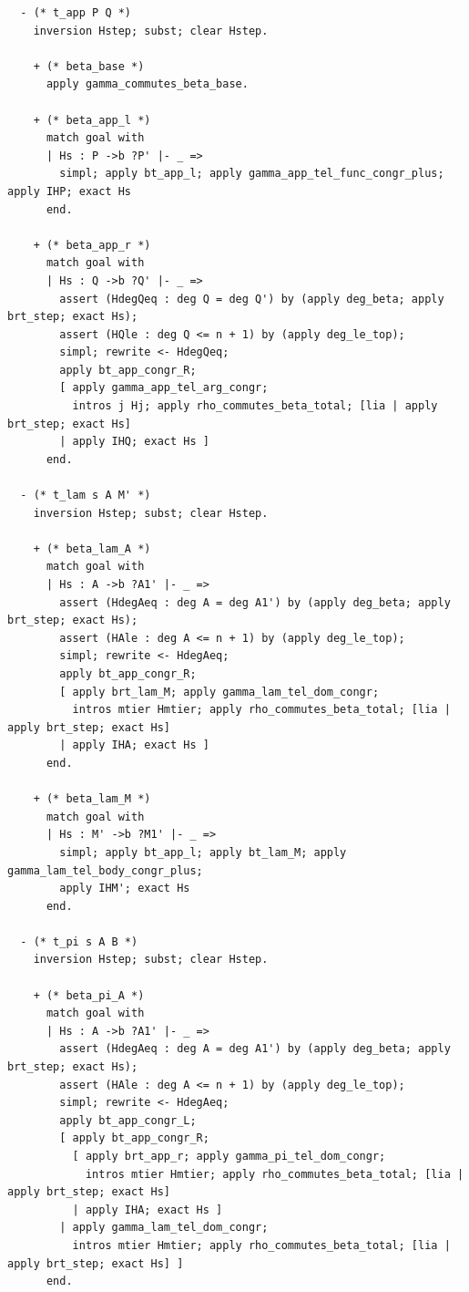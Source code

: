 \begin{latin}
\begin{verbatim}
  - (* t_app P Q *)
    inversion Hstep; subst; clear Hstep.

    + (* beta_base *)
      apply gamma_commutes_beta_base.

    + (* beta_app_l *)
      match goal with
      | Hs : P ->b ?P' |- _ =>
        simpl; apply bt_app_l; apply gamma_app_tel_func_congr_plus; apply IHP; exact Hs
      end.

    + (* beta_app_r *)
      match goal with
      | Hs : Q ->b ?Q' |- _ =>
        assert (HdegQeq : deg Q = deg Q') by (apply deg_beta; apply brt_step; exact Hs);
        assert (HQle : deg Q <= n + 1) by (apply deg_le_top);
        simpl; rewrite <- HdegQeq;
        apply bt_app_congr_R;
        [ apply gamma_app_tel_arg_congr;
          intros j Hj; apply rho_commutes_beta_total; [lia | apply brt_step; exact Hs]
        | apply IHQ; exact Hs ]
      end.

  - (* t_lam s A M' *)
    inversion Hstep; subst; clear Hstep.

    + (* beta_lam_A *)
      match goal with
      | Hs : A ->b ?A1' |- _ =>
        assert (HdegAeq : deg A = deg A1') by (apply deg_beta; apply brt_step; exact Hs);
        assert (HAle : deg A <= n + 1) by (apply deg_le_top);
        simpl; rewrite <- HdegAeq;
        apply bt_app_congr_R;
        [ apply brt_lam_M; apply gamma_lam_tel_dom_congr;
          intros mtier Hmtier; apply rho_commutes_beta_total; [lia | apply brt_step; exact Hs]
        | apply IHA; exact Hs ]
      end.

    + (* beta_lam_M *)
      match goal with
      | Hs : M' ->b ?M1' |- _ =>
        simpl; apply bt_app_l; apply bt_lam_M; apply gamma_lam_tel_body_congr_plus;
        apply IHM'; exact Hs
      end.

  - (* t_pi s A B *)
    inversion Hstep; subst; clear Hstep.

    + (* beta_pi_A *)
      match goal with
      | Hs : A ->b ?A1' |- _ =>
        assert (HdegAeq : deg A = deg A1') by (apply deg_beta; apply brt_step; exact Hs);
        assert (HAle : deg A <= n + 1) by (apply deg_le_top);
        simpl; rewrite <- HdegAeq;
        apply bt_app_congr_L;
        [ apply bt_app_congr_R;
          [ apply brt_app_r; apply gamma_pi_tel_dom_congr;
            intros mtier Hmtier; apply rho_commutes_beta_total; [lia | apply brt_step; exact Hs]
          | apply IHA; exact Hs ]
        | apply gamma_lam_tel_dom_congr;
          intros mtier Hmtier; apply rho_commutes_beta_total; [lia | apply brt_step; exact Hs] ]
      end.


\end{verbatim}
\end{latin}
